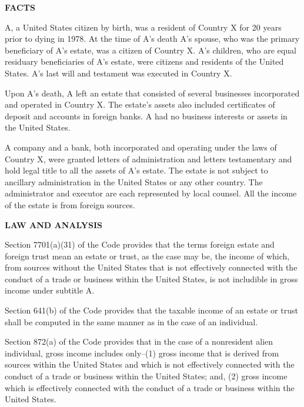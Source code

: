 \begin{select}
	\begin{center}\textbf{FACTS}
	\end{center} 
A, a United States citizen by birth, was a resident of Country X for 20 years prior to dying in 1978.  At the time of A's death A's spouse, who was the primary beneficiary of A's estate, was a citizen of Country X.  A's children, who are equal residuary beneficiaries of A's estate, were citizens and residents of the United States.  A's last will and testament was executed in Country X.

Upon A's death, A left an estate that consisted of several businesses incorporated and operated in Country X.  The estate's assets also included certificates of deposit and accounts in foreign banks.  A had no business interests or assets in the United States.

  A company and a bank, both incorporated and operating under the laws of Country X, were granted letters of administration and letters testamentary and hold legal title to all the assets of A's estate.  The estate is not subject to ancillary administration in the United States or any other country.  The administrator and executor are each represented by local counsel. All the income of the estate is from foreign sources.

\begin{center}\textbf{LAW AND ANALYSIS}
\end{center} 

  Section 7701(a)(31) of the Code provides that the terms foreign estate and foreign trust mean an estate or trust, as the case may be, the income of which, from sources without the United States that is not effectively connected with the conduct of a trade or business within the United States, is not includible in gross income under subtitle A.

  Section 641(b) of the Code provides that the taxable income of an estate or trust shall be computed in the same manner as in the case of an individual.

  Section 872(a) of the Code provides that in the case of a nonresident alien individual, gross income includes only--(1) gross income that is derived from sources within the United States and which is not effectively connected with the conduct of a trade or business within the United States; and, (2) gross income which is effectively connected with the conduct of a trade or business within the United States.


\end{select}
